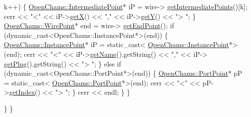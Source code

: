 \begin{DoxyCodeInclude}
       k++) \{
                            \hyperlink{class_open_chams_1_1_intermediate_point}{OpenChams::IntermediatePoint}* iP = wire->
      \hyperlink{class_open_chams_1_1_wire_aac2840e22e03db0ff2c0fe0f83c56fdd}{getIntermediatePoints}()[k];
                            cerr << \textcolor{stringliteral}{"<"} << iP->\hyperlink{class_open_chams_1_1_intermediate_point_a2b69e4312b7814c6efce42f851893409}{getX}() << \textcolor{stringliteral}{","} << iP->\hyperlink{class_open_chams_1_1_intermediate_point_a15f19cf52955c8c3406831b288681358}{getY}() << \textcolor{stringliteral}{"> "};
                        \}
                        \hyperlink{class_open_chams_1_1_wire_point}{OpenChams::WirePoint}* end = wire->
      \hyperlink{class_open_chams_1_1_wire_ab1c91025a4117cede119f53d9eb8093b}{getEndPoint}();
                        \textcolor{keywordflow}{if} (dynamic\_cast<OpenChams::InstancePoint*>(end)) \{
                            \hyperlink{class_open_chams_1_1_instance_point}{OpenChams::InstancePoint}* iP = \textcolor{keyword}{static\_cast<}
      \hyperlink{class_open_chams_1_1_instance_point}{OpenChams::InstancePoint}*\textcolor{keyword}{>}(end);
                            cerr << \textcolor{stringliteral}{"<"} << iP->\hyperlink{class_open_chams_1_1_instance_point_a2858c0c4e8b5108f041237cf5a802029}{getName}().getString() << \textcolor{stringliteral}{","} << iP->
      \hyperlink{class_open_chams_1_1_instance_point_a646d464666fc56ab2e04a6b87fdd3279}{getPlug}().getString() << \textcolor{stringliteral}{"> "};
                        \} \textcolor{keywordflow}{else} \textcolor{keywordflow}{if} (dynamic\_cast<OpenChams::PortPoint*>(end)) \{
                            \hyperlink{class_open_chams_1_1_port_point}{OpenChams::PortPoint}* pP = \textcolor{keyword}{static\_cast<}
      \hyperlink{class_open_chams_1_1_port_point}{OpenChams::PortPoint}*\textcolor{keyword}{>}(end);
                            cerr << \textcolor{stringliteral}{"<"} << pP->\hyperlink{class_open_chams_1_1_port_point_ab4018980dcd1fed5208e7a72846cd815}{getIndex}() << \textcolor{stringliteral}{"> "};
                        \}
                        cerr << endl;
                    \}
                \}

            \}
        \}


\end{DoxyCodeInclude}
